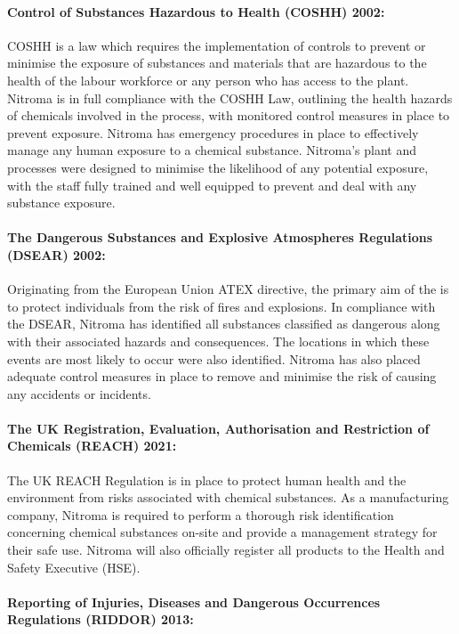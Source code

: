 \paragraph{Control of Substances Hazardous to Health (COSHH) 2002:}

COSHH is a law which requires the implementation of controls to prevent or minimise the exposure of substances and materials that are hazardous to the health of the labour workforce or any person who has access to the plant. Nitroma is in full compliance with the COSHH Law, outlining the health hazards of chemicals involved in the process, with monitored control measures in place to prevent exposure. Nitroma has emergency procedures in place to effectively manage any human exposure to a chemical substance. Nitroma’s plant and processes were designed to minimise the likelihood of any potential exposure, with the staff fully trained and well equipped to prevent and deal with any substance exposure. 

\paragraph{The Dangerous Substances and Explosive Atmospheres Regulations (DSEAR) 2002:}

Originating from the European Union ATEX directive, the primary aim of the is to protect individuals from the risk of fires and explosions. In compliance with the DSEAR, Nitroma has identified all substances classified as dangerous along with their associated hazards and consequences. The locations in which these events are most likely to occur were also identified. Nitroma has also placed adequate control measures in place to remove and minimise the risk of causing any accidents or incidents. 

\paragraph{The UK Registration, Evaluation, Authorisation and Restriction of Chemicals (REACH) 2021:}

The UK REACH Regulation is in place to protect human health and the environment from risks associated with chemical substances. As a manufacturing company, Nitroma is required to perform a thorough risk identification concerning chemical substances on-site and provide a management strategy for their safe use. Nitroma will also officially register all products to the Health and Safety Executive (HSE). 

\paragraph{Reporting of Injuries, Diseases and Dangerous Occurrences Regulations (RIDDOR) 2013:}

